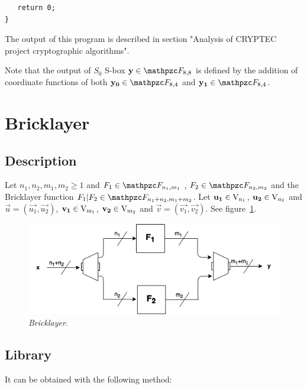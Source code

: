 \begin{example}
\begin{verbatim}
   return 0;
}
\end{verbatim}

The output of this program is described in section "Analysis of CRYPTEC project cryptographic algorithms".

Note that the output of $S_0$ S-box $\vec{y} \in \funct{F}_{8,8}$ is defined by the addition of coordinate functions of both $\vec{y_0} \in \funct{F}_{8,4}$ and $\vec{y_1} \in \funct{F}_{8,4}$. 
\end{example}

\section{Bricklayer}

\subsection{Description}

\begin{definition}
Let $n_1,n_2,m_1,m_2 \geq 1$ and $F_1 \in \funct{F}_{n_1,m_1}$ , $F_2 \in \funct{F}_{n_2,m_2}$ and the Bricklayer function $F_1 | F_2 \in \funct{F}_{n_1+n_2,m_1+m_2}$. Let $\vec{u_1} \in \gf{V_{n_1}}$, $\vec{u_2} \in \gf{V_{n_2}}$ and $\vec{u}=(\vec{u_1} , \vec{u_2})$, $\vec{v_1} \in \gf{V_{m_1}}$, $\vec{v_2} \in \gf{V_{m_2}}$ and $\vec{v}=(\vec{v_1} , \vec{v_2})$.  See figure~\ref{fig:Bricklayer}.
\end{definition}

\begin{figure}[htbp!]
\centering
\includegraphics[width=\textwidth]{Bricklayer}
\caption[Bricklayer]{\textit{Bricklayer}.}
\label{fig:Bricklayer}
\end{figure}

\subsection{Library}

It can be obtained with the following method:
     
